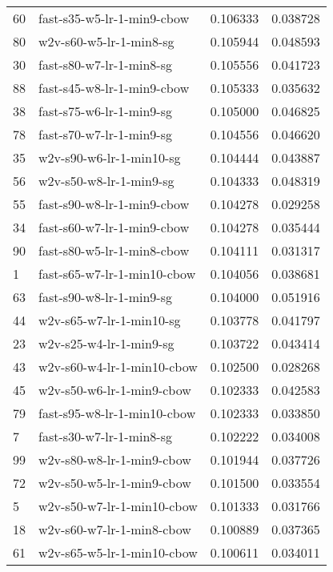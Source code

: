 \begin{tabular}{llrr}
60 &   fast-s35-w5-lr-1-min9-cbow &  0.106333 &  0.038728 \\
80 &      w2v-s60-w5-lr-1-min8-sg &  0.105944 &  0.048593 \\
30 &     fast-s80-w7-lr-1-min8-sg &  0.105556 &  0.041723 \\
88 &   fast-s45-w8-lr-1-min9-cbow &  0.105333 &  0.035632 \\
38 &     fast-s75-w6-lr-1-min9-sg &  0.105000 &  0.046825 \\
78 &     fast-s70-w7-lr-1-min9-sg &  0.104556 &  0.046620 \\
35 &     w2v-s90-w6-lr-1-min10-sg &  0.104444 &  0.043887 \\
56 &      w2v-s50-w8-lr-1-min9-sg &  0.104333 &  0.048319 \\
55 &   fast-s90-w8-lr-1-min9-cbow &  0.104278 &  0.029258 \\
34 &   fast-s60-w7-lr-1-min9-cbow &  0.104278 &  0.035444 \\
90 &   fast-s80-w5-lr-1-min8-cbow &  0.104111 &  0.031317 \\
1  &  fast-s65-w7-lr-1-min10-cbow &  0.104056 &  0.038681 \\
63 &     fast-s90-w8-lr-1-min9-sg &  0.104000 &  0.051916 \\
44 &     w2v-s65-w7-lr-1-min10-sg &  0.103778 &  0.041797 \\
23 &      w2v-s25-w4-lr-1-min9-sg &  0.103722 &  0.043414 \\
43 &   w2v-s60-w4-lr-1-min10-cbow &  0.102500 &  0.028268 \\
45 &    w2v-s50-w6-lr-1-min9-cbow &  0.102333 &  0.042583 \\
79 &  fast-s95-w8-lr-1-min10-cbow &  0.102333 &  0.033850 \\
7  &     fast-s30-w7-lr-1-min8-sg &  0.102222 &  0.034008 \\
99 &    w2v-s80-w8-lr-1-min9-cbow &  0.101944 &  0.037726 \\
72 &    w2v-s50-w5-lr-1-min9-cbow &  0.101500 &  0.033554 \\
5  &   w2v-s50-w7-lr-1-min10-cbow &  0.101333 &  0.031766 \\
18 &    w2v-s60-w7-lr-1-min8-cbow &  0.100889 &  0.037365 \\
61 &   w2v-s65-w5-lr-1-min10-cbow &  0.100611 &  0.034011 \\
\bottomrule
\end{tabular}
